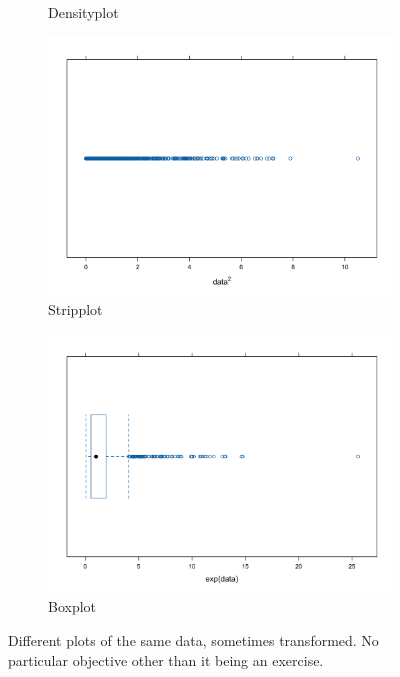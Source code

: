 \documentclass[12pt]{article}
\begin{document}
\begin{figure}[t]
\begin{subfigure}{0.48\textwidth}
    \caption{Densityplot}
    \label{density}
\end{subfigure}
\hfill
\begin{subfigure}{0.48\textwidth}
    \includegraphics[width=\textwidth]{stripplot.jpg}
    \caption{Stripplot}
    \label{stripplot}
\end{subfigure}
\hfill
\begin{subfigure}{0.48\textwidth}
    \includegraphics[width=\textwidth]{boxplot.jpg}
    \caption{Boxplot}
    \label{boxplot}
\end{subfigure}

\caption{Different plots of the same data, sometimes transformed. No particular objective other than it being an exercise.}
\label{fig:figures}
\end{figure}
\end{document}
